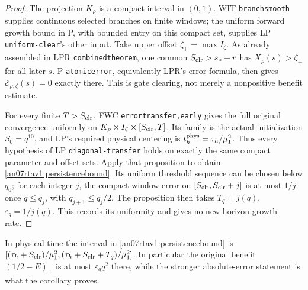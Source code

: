 \documentclass[11pt]{article}
\numberwithin{equation}{section}
\begin{document}
\begin{proof}
The projection \(K_\rho\) is a compact interval in \((0,1)\).
WIT \texttt{branchsmooth} supplies continuous selected branches
on finite windows; the uniform forward growth bound in P, with
bounded entry on this compact set, supplies LP
\texttt{uniform-clear}'s other input. Take upper offset
\(\zeta_+=\max I_\zeta\). As already assembled in LPR
\texttt{combinedtheorem}, one common \(S_{\rm clr}>s_*+r\)
has \(X_\rho(s)>\zeta_+\) for all later \(s\).
P \texttt{atomicerror}, equivalently LPR's error formula, then
gives \(\mathcal E_{\rho,\zeta}(s)=0\) exactly there.
This is gate clearing, not merely a nonpositive benefit estimate.

For every finite \(T>S_{\rm clr}\), FWC
\texttt{errortransfer,\allowbreak early} gives the full original convergence
uniformly on \(K_\rho\times I_\zeta\times[S_{\rm clr},T]\).
Its family is the actual initialization \(S_0=q^{10}\),
and LP's required physical centering is
\(t_h^{\rm phys}=\tau_h/\mu_1^2\). Thus every hypothesis of
LP \texttt{diagonal-transfer} holds on exactly the same compact
parameter and offset sets. Apply that proposition to obtain
\eqref{an07rtav1:persistencebound}.
Its uniform threshold sequence can be chosen below \(q_0\);
for each integer \(j\), the compact-window error on
\([S_{\rm clr},S_{\rm clr}+j]\) is at most \(1/j\) once
\(q\le q_j\), with \(q_{j+1}\le q_j/2\).
The proposition then takes \(T_q=j(q)\), \(\varepsilon_q=1/j(q)\).
This records its uniformity and gives no new horizon-growth rate.
\end{proof}
In physical time the interval in
\eqref{an07rtav1:persistencebound} is
\([ (\tau_h+S_{\rm clr})/\mu_1^2,
    (\tau_h+S_{\rm clr}+T_q)/\mu_1^2]\).
In particular the original benefit \((1/2-E)_+\) is at most
\(\varepsilon_q q^2\) there, while the stronger absolute-error
statement is what the corollary proves.
\end{document}
